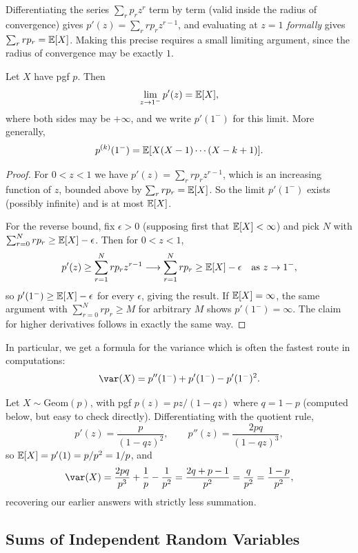 \documentclass[a4paper]{scrartcl}
\begin{document}
Differentiating the series $\sum_r p_r z^r$ term by term (valid inside the radius of convergence) gives $p'(z) = \sum_r r p_r z^{r - 1}$, and evaluating at $z = 1$ \emph{formally} gives $\sum_r r p_r = \mathbb{E}[X]$. Making this precise requires a small limiting argument, since the radius of convergence may be exactly $1$.

\begin{theorem}
	Let $X$ have pgf $p$. Then
	$$
	\lim_{z \to 1^-} p'(z) = \mathbb{E}[X],
	$$
	where both sides may be $+\infty$, and we write $p'(1^-)$ for this limit. More generally,
	$$
	p^{(k)}(1^-) = \mathbb{E}[X(X - 1)\cdots(X - k + 1)].
	$$
\end{theorem}
\begin{proof}
	For $0 < z < 1$ we have $p'(z) = \sum_{r} r p_r z^{r - 1}$, which is an increasing function of $z$, bounded above by $\sum_r r p_r = \mathbb{E}[X]$. So the limit $p'(1^-)$ exists (possibly infinite) and is at most $\mathbb{E}[X]$.

	For the reverse bound, fix $\epsilon > 0$ (supposing first that $\mathbb{E}[X] < \infty$) and pick $N$ with $\sum_{r = 0}^{N} r p_r \geq \mathbb{E}[X] - \epsilon$. Then for $0 < z < 1$,
	$$
	p'(z) \geq \sum_{r = 1}^{N} r p_r z^{r - 1} \longrightarrow \sum_{r = 1}^{N} r p_r \geq \mathbb{E}[X] - \epsilon \quad \text{as } z \rightarrow 1^-,
	$$
	so $p'(1^-) \geq \mathbb{E}[X] - \epsilon$ for every $\epsilon$, giving the result. If $\mathbb{E}[X] = \infty$, the same argument with $\sum_{r=0}^N rp_r \geq M$ for arbitrary $M$ shows $p'(1^-) = \infty$. The claim for higher derivatives follows in exactly the same way.
\end{proof}

In particular, we get a formula for the variance which is often the fastest route in computations:
$$
\var(X) = p''(1^-) + p'(1^-) - p'(1^-)^2.
$$

\begin{example}
	Let $X \sim \mathrm{Geom}(p)$, with pgf $p(z) = pz/(1 - qz)$ where $q = 1 - p$ (computed below, but easy to check directly). Differentiating with the quotient rule,
	$$
	p'(z) = \frac{p}{(1 - qz)^2}, \qquad p''(z) = \frac{2pq}{(1 - qz)^3},
	$$
	so $\mathbb{E}[X] = p'(1) = p/p^2 = 1/p$, and
	$$
	\var(X) = \frac{2pq}{p^3} + \frac{1}{p} - \frac{1}{p^2} = \frac{2q + p - 1}{p^2} = \frac{q}{p^2} = \frac{1-p}{p^2},
	$$
	recovering our earlier answers with strictly less summation.
\end{example}

\subsection{Sums of Independent Random Variables}
\end{document}
